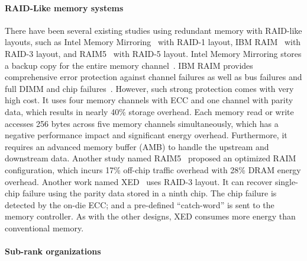 \documentclass[11pt]{article}
\begin{document}
\paragraph{RAID-Like memory systems}

There have been several existing studies using redundant memory with RAID-like
layouts, such as Intel Memory Mirroring~\cite{intel:mirror} with RAID-1 layout,
IBM RAIM~\cite{IBM:12} with RAID-3 layout, and RAIM5~\cite{RAIM5:17} with RAID-5
layout. Intel Memory Mirroring stores a backup copy for the entire memory
channel~\cite{intel:mirror}.  IBM RAIM provides comprehensive error protection
against channel failures as well as bus failures and full DIMM and chip
failures~\cite{IBM:12}. However, such strong protection comes with very high
cost. It uses four memory channels with ECC and one channel with parity data,
which results in nearly 40\% storage overhead. Each memory read or write
accesses 256 bytes across five memory channels simultaneously, which has a
negative performance impact and significant energy overhead.  Furthermore, it
requires an advanced memory buffer (AMB) to handle the upstream and downstream
data. Another study named RAIM5~\cite{RAIM5:17} proposed an optimized RAIM
configuration, which incurs 17\% off-chip traffic overhead with 28\% DRAM energy
overhead.  Another work named XED~\cite{XED} uses RAID-3 layout.  It can recover
single-chip failure using the parity data stored in a ninth chip. The chip
failure is detected by the on-die ECC; and a pre-defined ``catch-word'' is sent
to the memory controller. As with the other designs, XED consumes more energy
than conventional memory.

\paragraph{Sub-rank organizations}
\end{document}
